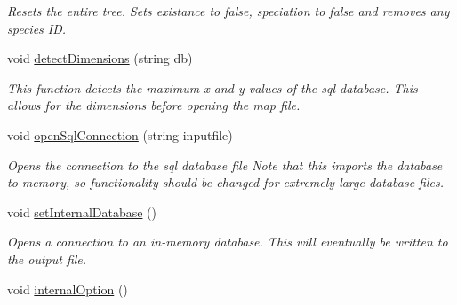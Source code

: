 \begin{DoxyCompactItemize}
\begin{DoxyCompactList}\small\item\em Resets the entire tree. Sets existance to false, speciation to false and removes any species ID. \end{DoxyCompactList}\item 
void \hyperlink{group___community_objects_a579c5f423fc2461838a80baf6b396310}{detect\+Dimensions} (string db)
\begin{DoxyCompactList}\small\item\em This function detects the maximum x and y values of the sql database. This allows for the dimensions before opening the map file. \end{DoxyCompactList}\item 
void \hyperlink{group___community_objects_a389c35f39ed73eb1e5dc1476c220c140}{open\+Sql\+Connection} (string inputfile)
\begin{DoxyCompactList}\small\item\em Opens the connection to the sql database file Note that this imports the database to memory, so functionality should be changed for extremely large database files. \end{DoxyCompactList}\item 
void \hyperlink{group___community_objects_acba6b894e62ad4ecccbcf86f064ebc46}{set\+Internal\+Database} ()\hypertarget{group___community_objects_acba6b894e62ad4ecccbcf86f064ebc46}{}\label{group___community_objects_acba6b894e62ad4ecccbcf86f064ebc46}

\begin{DoxyCompactList}\small\item\em Opens a connection to an in-\/memory database. This will eventually be written to the output file. \end{DoxyCompactList}\item 
void \hyperlink{group___community_objects_a527f03120e4cb211e466cab7e405ba9a}{internal\+Option} ()\hypertarget{group___community_objects_a527f03120e4cb211e466cab7e405ba9a}{}\label{group___community_objects_a527f03120e4cb211e466cab7e405ba9a}


\end{DoxyCompactItemize}

